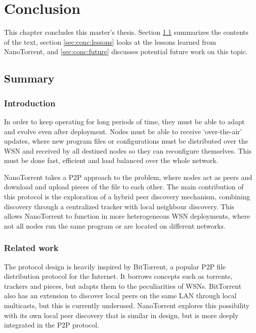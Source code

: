 \chapter{Conclusion}
\label{cha:conclusion}

This chapter concludes this master's thesis. Section \ref{sec:conc:summary} summarizes the contents of the text, section \ref{sec:conc:lessons} looks at the lessons learned from NanoTorrent, and \ref{sec:conc:future} discusses potential future work on this topic.

\section{Summary}
\label{sec:conc:summary}

\subsection{Introduction}
In order to keep  operating for long periods of time, they must be able to adapt and evolve even after deployment. Nodes must be able to receive `over-the-air' updates, where new program files or configurations must be distributed over the \gls{WSN} and received by all destined nodes so they can reconfigure themselves. This must be done fast, efficient and load balanced over the whole network.

NanoTorrent takes a \acrlong{P2P} approach to the problem, where nodes act as peers and download and upload pieces of the file to each other. The main contribution of this protocol is the exploration of a hybrid peer discovery mechanism, combining discovery through a centralized tracker with local neighbour discovery. This allows NanoTorrent to function in more heterogeneous \gls{WSN} deployments, where not all nodes run the same program or are located on different networks.

\subsection{Related work}
The protocol design is heavily inspired by BitTorrent, a popular \gls{P2P} file distribution protocol for the Internet. It borrows concepts such as torrents, trackers and pieces, but adapts them to the peculiarities of \glspl{WSN}. BitTorrent also has an extension to discover local peers on the same \gls{LAN} through local multicasts, but this is currently underused. NanoTorrent explores this possibility with its own local peer discovery that is similar in design, but is more deeply integrated in the \gls{P2P} protocol.

